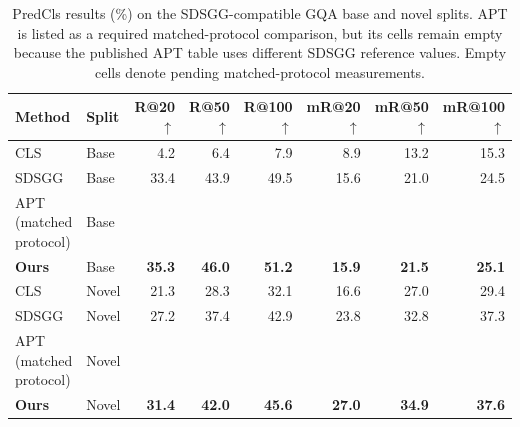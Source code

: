 \begin{table}[t]
\centering
\caption{PredCls results (\%) on the SDSGG-compatible GQA base and novel splits. APT is listed as a required matched-protocol comparison, but its cells remain empty because the published APT table uses different SDSGG reference values. Empty cells denote pending matched-protocol measurements.}
\label{tab:gqa_base_novel}
\small
\setlength{\tabcolsep}{5.0pt}
\begin{tabular}{llrrrrrr}
\toprule
Method & Split & R@20$\uparrow$ & R@50$\uparrow$ & R@100$\uparrow$ & mR@20$\uparrow$ & mR@50$\uparrow$ & mR@100$\uparrow$ \\
\midrule
CLS \cite{radford2021clip} & Base & 4.2 & 6.4 & 7.9 & 8.9 & 13.2 & 15.3 \\
SDSGG \cite{chen2024sdsgg} & Base & 33.4 & 43.9 & 49.5 & 15.6 & 21.0 & 24.5 \\
APT (matched protocol) \cite{luo2026apt} & Base & & & & & & \\
\rowcolor{blue!6}\textbf{Ours} & Base & \textbf{35.3} & \textbf{46.0} & \textbf{51.2} & \textbf{15.9} & \textbf{21.5} & \textbf{25.1} \\
\midrule
CLS \cite{radford2021clip} & Novel & 21.3 & 28.3 & 32.1 & 16.6 & 27.0 & 29.4 \\
SDSGG \cite{chen2024sdsgg} & Novel & 27.2 & 37.4 & 42.9 & 23.8 & 32.8 & 37.3 \\
APT (matched protocol) \cite{luo2026apt} & Novel & & & & & & \\
\rowcolor{blue!6}\textbf{Ours} & Novel & \textbf{31.4} & \textbf{42.0} & \textbf{45.6} & \textbf{27.0} & \textbf{34.9} & \textbf{37.6} \\
\bottomrule
\end{tabular}
\end{table}
